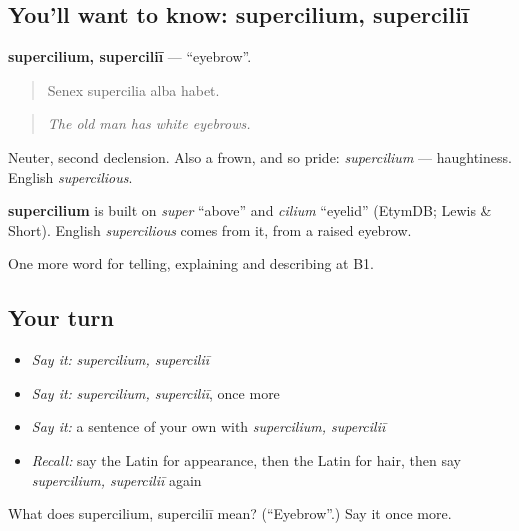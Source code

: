 \subsection*{You'll want to know: supercilium, superciliī}
\textbf{supercilium, superciliī} — \textquotedblleft{}eyebrow\textquotedblright{}.

\begin{quote}
Senex supercilia alba habet.
\end{quote}

\begin{quote}
\emph{The old man has white eyebrows.}
\end{quote}

Neuter, second declension. Also a frown, and so pride: \emph{supercilium} — haughtiness. English \emph{supercilious}.

\begin{cousinweb}
\textbf{supercilium} is built on \emph{super} \textquotedblleft{}above\textquotedblright{} and \emph{cilium} \textquotedblleft{}eyelid\textquotedblright{} (EtymDB; Lewis \& Short). English \emph{supercilious} comes from it, from a raised eyebrow.
\end{cousinweb}

\begin{grammarlens}[title={What you've built}]
One more word for telling, explaining and describing at B1.
\end{grammarlens}

\subsection*{Your turn}
\begin{itemize}
\raggedright
  \item \emph{Say it:} \emph{supercilium, superciliī}
  \item \emph{Say it:} \emph{supercilium, superciliī}, once more
  \item \emph{Say it:} a sentence of your own with \emph{supercilium, superciliī}
  \item \emph{Recall:} say the Latin for appearance, then the Latin for hair, then say \emph{supercilium, superciliī} again
\end{itemize}

\begin{tcolorbox}[breakable,colback=teal!4,colframe=teal!35!black,title={Before you move on}]
What does supercilium, superciliī mean? (\textquotedblleft{}Eyebrow\textquotedblright{}.) Say it once more.
\end{tcolorbox}
